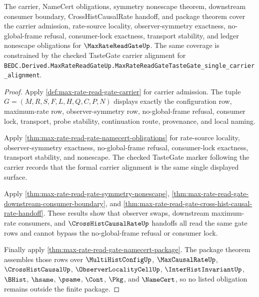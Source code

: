\begin{theorem}
\label{thm:max-rate-read-gate-namecert-obligation-coverage}
The carrier, NameCert obligations, symmetry nonescape theorem, downstream consumer boundary, CrossHistCausalRate handoff, and package theorem cover the carrier admission, rate-source locality, observer-symmetry exactness, no-global-frame refusal, consumer-lock exactness, transport stability, and ledger nonescape obligations for $\MaxRateReadGateUp$. The same coverage is constrained by the checked TasteGate carrier alignment for \texttt{BEDC.Derived.MaxRateReadGateUp.MaxRateReadGateTasteGate\_single\_carrier\_alignment}.
\end{theorem}
\begin{proof}
Apply \autoref{def:max-rate-read-gate-carrier} for carrier admission. The tuple $G=(M,R,S,F,L,H,Q,C,P,N)$ displays exactly the configuration row, maximum-rate row, observer-symmetry row, no-global-frame refusal, consumer lock, transport, probe stability, continuation route, provenance, and local naming.

Apply \autoref{thm:max-rate-read-gate-namecert-obligations} for rate-source locality, observer-symmetry exactness, no-global-frame refusal, consumer-lock exactness, transport stability, and nonescape. The checked TasteGate marker following the carrier records that the formal carrier alignment is the same single displayed surface.

Apply \autoref{thm:max-rate-read-gate-symmetry-nonescape}, \autoref{thm:max-rate-read-gate-downstream-consumer-boundary}, and \autoref{thm:max-rate-read-gate-cross-hist-causal-rate-handoff}. These results show that observer swaps, downstream maximum-rate consumers, and $\CrossHistCausalRateUp$ handoffs all read the same gate rows and cannot bypass the no-global-frame refusal or consumer lock.

Finally apply \autoref{thm:max-rate-read-gate-namecert-package}. The package theorem assembles those rows over $\MultiHistConfigUp$, $\MaxCausalRateUp$, $\CrossHistCausalUp$, $\ObserverLocalityCellUp$, $\InterHistInvariantUp$, $\BHist$, $\hsame$, $\psame$, $\Cont$, $\Pkg$, and $\NameCert$, so no listed obligation remains outside the finite package.
\end{proof}


